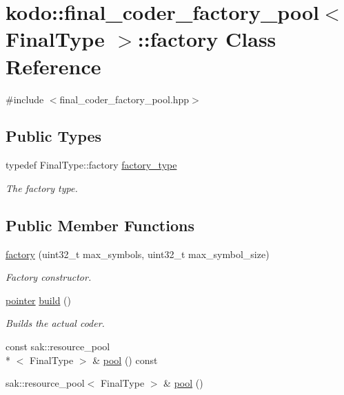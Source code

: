 \hypertarget{classkodo_1_1final__coder__factory__pool_1_1factory}{\section{kodo\-:\-:final\-\_\-coder\-\_\-factory\-\_\-pool$<$ Final\-Type $>$\-:\-:factory Class Reference}
\label{classkodo_1_1final__coder__factory__pool_1_1factory}
}


{\ttfamily \#include $<$final\-\_\-coder\-\_\-factory\-\_\-pool.\-hpp$>$}

\subsection*{Public Types}
\begin{DoxyCompactItemize}
\item 
\hypertarget{classkodo_1_1final__coder__factory__pool_1_1factory_a673b6da58a0ed21dbe089e0e914b00a7}{typedef Final\-Type\-::factory \hyperlink{classkodo_1_1final__coder__factory__pool_1_1factory_a673b6da58a0ed21dbe089e0e914b00a7}{factory\-\_\-type}}\label{classkodo_1_1final__coder__factory__pool_1_1factory_a673b6da58a0ed21dbe089e0e914b00a7}

\begin{DoxyCompactList}\small\item\em The factory type. \end{DoxyCompactList}\end{DoxyCompactItemize}
\subsection*{Public Member Functions}
\begin{DoxyCompactItemize}
\item 
\hyperlink{classkodo_1_1final__coder__factory__pool_1_1factory_a628ce5338871facf3d201d59fb82ddf4}{factory} (uint32\-\_\-t max\-\_\-symbols, uint32\-\_\-t max\-\_\-symbol\-\_\-size)
\begin{DoxyCompactList}\small\item\em Factory constructor. \end{DoxyCompactList}\item 
\hyperlink{classkodo_1_1final__coder__factory__pool_afa50091a69bbad9de46e96b1f64795bd}{pointer} \hyperlink{classkodo_1_1final__coder__factory__pool_1_1factory_a805538b6d2546f6797ecdba5f72167de}{build} ()
\begin{DoxyCompactList}\small\item\em Builds the actual coder. \end{DoxyCompactList}\item 
const sak\-::resource\-\_\-pool\\*
$<$ Final\-Type $>$ \& \hyperlink{classkodo_1_1final__coder__factory__pool_1_1factory_a265ff2f83f67cf95a5530561d8691fb8}{pool} () const 
\item 
sak\-::resource\-\_\-pool$<$ Final\-Type $>$ \& \hyperlink{classkodo_1_1final__coder__factory__pool_1_1factory_af81fb7234eff7c0304b0284daf9d96ee}{pool} ()
\end{DoxyCompactItemize}


